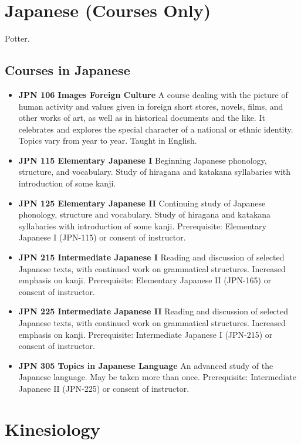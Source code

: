 \documentclass[
  letterpaper,
]{scrbook}
\providecommand{\tightlist}{%
  \setlength{\itemsep}{0pt}\setlength{\parskip}{0pt}}
\begin{document}
\hypertarget{sec-japanese}{%
\section{Japanese (Courses Only)}\label{sec-japanese}}

Potter.

\hypertarget{courses-in-japanese}{%
\subsection{Courses in Japanese}\label{courses-in-japanese}}

\begin{itemize}
\tightlist
\item
  \textbf{JPN 106 Images Foreign Culture} A course dealing with the
  picture of human activity and values given in foreign short stores,
  novels, films, and other works of art, as well as in historical
  documents and the like. It celebrates and explores the special
  character of a national or ethnic identity. Topics vary from year to
  year. Taught in English.
\item
  \textbf{JPN 115 Elementary Japanese I} Beginning Japanese phonology,
  structure, and vocabulary. Study of hiragana and katakana syllabaries
  with introduction of some kanji.
\item
  \textbf{JPN 125 Elementary Japanese II} Continuing study of Japanese
  phonology, structure and vocabulary. Study of hiragana and katakana
  syllabaries with introduction of some kanji. Prerequisite: Elementary
  Japanese I (JPN-115) or consent of instructor.
\item
  \textbf{JPN 215 Intermediate Japanese I} Reading and discussion of
  selected Japanese texts, with continued work on grammatical
  structures. Increased emphasis on kanji. Prerequisite: Elementary
  Japanese II (JPN-165) or consent of instructor.
\item
  \textbf{JPN 225 Intermediate Japanese II} Reading and discussion of
  selected Japanese texts, with continued work on grammatical
  structures. Increased emphasis on kanji. Prerequisite: Intermediate
  Japanese I (JPN-215) or consent of instructor.
\item
  \textbf{JPN 305 Topics in Japanese Language} An advanced study of the
  Japanese language. May be taken more than once. Prerequisite:
  Intermediate Japanese II (JPN-225) or consent of instructor.
\end{itemize}

\hypertarget{sec-kinesiology}{%
\section{Kinesiology}\label{sec-kinesiology}}
\end{document}
